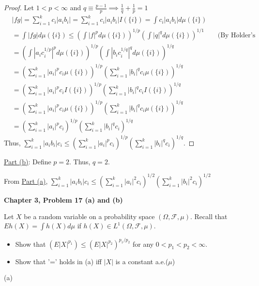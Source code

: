 \documentclass[12pt,letterpaper, onecolumn]{exam}
\newcommand{\calF}{\mathcal{F}}
\newcommand{\ksum}{\sum_{i = 1}^{k}}
\begin{document}
\begin{questions}
\begin{solution}
\begin{proof}
Let $1 < p < \infty$ and $q \equiv \frac{p - 1}{p} \implies \frac{1}{q} + \frac{1}{p} = 1$
\begin{align*}
    & |fg| = \ksum c_i|a_ib_i| = \ksum c_i|a_ib_i| I(\{i\}) = \int c_i|a_ib_i| d \mu(\{i\}) \\
    & = \int |fg| d\mu(\{i\})
     \leq \left(\int |f|^p d\mu(\{i\})\right)^{1/p} \left(\int |q|^q d\mu(\{i\})\right)^{1/1} && \textrm{(By H$\ddot{o}$lder's Inequality)} \\
     & = \left(\int |a_i c_i^{1/p}|^p d\mu(\{i\})\right)^{1/p} \left(\int |b_i c_i^{1/q}|^q d\mu(\{i\})\right)^{1/q} \\
     & = \left(\ksum |a_i|^p c_i \mu(\{i\})\right)^{1/p} \left(\ksum |b_i|^q c_i \mu(\{i\})\right)^{1/q} \\
     & = \left(\ksum |a_i|^p c_i I(\{i\})\right)^{1/p} \left(\ksum |b_i|^q c_i I(\{i\})\right)^{1/q} \\ 
     & = \left(\ksum |a_i|^p c_i \mu(\{i\})\right)^{1/p} \left(\ksum |b_i|^q c_i \mu(\{i\})\right)^{1/q} \\
     & = \left(\ksum |a_i|^p c_i \right)^{1/p} \left(\ksum |b_i|^q c_i\right)^{1/q}
\end{align*}
Thus, $\ksum |a_i b_i|c_i \leq \left(\ksum |a_i|^p c_i\right)^{1/p} \left( \ksum |b_i|^q c_i \right)^{1/q}$.
\end{proof}

\underline{Part (b)}:
Define $p = 2$. Thus, $q = 2$. 

From \underline{Part (a)}, $\ksum |a_i b_i| c_i \leq \left(\ksum |a_i|^2 c_i\right)^{1/2} \left(\ksum |b_i|^2 c_i\right)^{1/2}$
    \end{solution}

    \question \textbf{Chapter 3, Problem 17 (a) and (b)}

    Let $X$ be a random variable on a probability space $(\Omega, \calF, \mu)$. Recall that $Eh(X) = \int h(X) d\mu$ if $h(X) \in L^1(\Omega, \calF, \mu)$.
    \begin{itemize}
        \item[(a)] Show that $(E|X|^{p_1}) \leq (E|X|^{p_2})^{p_1/p_2}$ for any $0 < p_1 < p_2 < \infty$.
        \item[(b)] Show that '=' holds in (a) iff $|X|$ is a constant a.e.($\mu$)
    \end{itemize}
    \begin{solution}
        (a)


\end{solution}
\end{questions}
\end{document}
